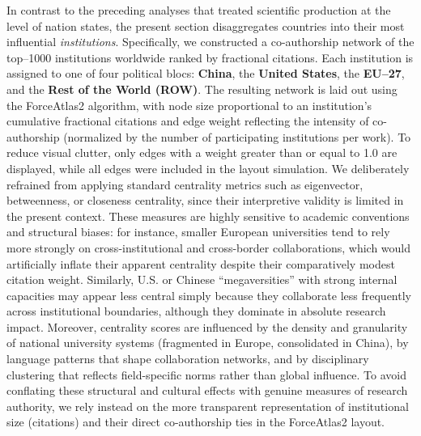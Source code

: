 \documentclass{article}
\begin{document}
In contrast to the preceding analyses that treated scientific production at the level of nation states, the present section disaggregates countries into their most influential \textit{institutions}. Specifically, we constructed a co-authorship network of the top--1000 institutions worldwide ranked by fractional citations. Each institution is assigned to one of four political blocs: \textbf{China}, the \textbf{United States}, the \textbf{EU--27}, and the \textbf{Rest of the World (ROW)}. The resulting network is laid out using the ForceAtlas2 algorithm, with node size proportional to an institution's cumulative fractional citations and edge weight reflecting the intensity of co-authorship (normalized by the number of participating institutions per work). To reduce visual clutter, only edges with a weight greater than or equal to 1.0 are displayed, while all edges were included in the layout simulation. We deliberately refrained from applying standard centrality metrics such as eigenvector, betweenness, or closeness centrality, since their interpretive validity is limited in the present context. These measures are highly sensitive to academic conventions and structural biases: for instance, smaller European universities tend to rely more strongly on cross-institutional and cross-border collaborations, which would artificially inflate their apparent centrality despite their comparatively modest citation weight. Similarly, U.S. or Chinese “megaversities” with strong internal capacities may appear less central simply because they collaborate less frequently across institutional boundaries, although they dominate in absolute research impact. Moreover, centrality scores are influenced by the density and granularity of national university systems (fragmented in Europe, consolidated in China), by language patterns that shape collaboration networks, and by disciplinary clustering that reflects field-specific norms rather than global influence. To avoid conflating these structural and cultural effects with genuine measures of research authority, we rely instead on the more transparent representation of institutional size (citations) and their direct co-authorship ties in the ForceAtlas2 layout.
\end{document}
